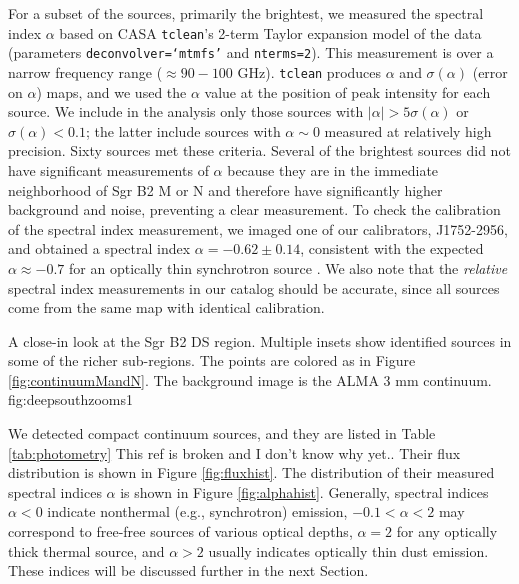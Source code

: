 \documentclass[twocolumn]{aastex61}
\begin{document}
For a subset of the sources, primarily the brightest, we measured the spectral
index $\alpha$ based on CASA \texttt{tclean}'s  2-term Taylor expansion model
of the data (parameters \texttt{deconvolver=`mtmfs'} and \texttt{nterms=2}).
This measurement is over a narrow frequency range ($\approx90-100$ GHz).
\texttt{tclean} produces $\alpha$ and $\sigma(\alpha)$ (error on $\alpha$)
maps, and we used the $\alpha$ value at the position of peak intensity for each
source.  We include in the analysis only those sources with $|\alpha| > 5
\sigma(\alpha)$ or $\sigma(\alpha) < 0.1$; the latter include sources with
$\alpha\sim0$ measured at relatively high precision.  Sixty sources met these
criteria. Several of the brightest sources did not have significant
measurements of $\alpha$ because they are in the immediate neighborhood of Sgr
B2 M or N and therefore have significantly higher background and noise,
preventing a clear measurement.  To check the calibration of the spectral index
measurement, we imaged one of our calibrators, J1752-2956, and obtained a
spectral index $\alpha=-0.62\pm0.14$, consistent with the expected
$\alpha\approx-0.7$ for an optically thin synchrotron source
\citep[e.g.][]{Condon2007a}.  We also note that the \emph{relative} spectral
index measurements in our catalog should be accurate, since all sources come
from the same map with identical calibration.

{A close-in look at the Sgr B2 DS region.  Multiple insets show identified sources
in some of the richer sub-regions.  The points are colored as in Figure
\ref{fig:continuumMandN}.  The background image is the ALMA 3 mm continuum.}
{fig:deepsouthzooms}{1}{\textwidth}

We detected \ncores compact continuum sources, and they are listed
in Table \ref{tab:photometry} {\color{red} This ref is broken and I don't know
why yet.}.  Their flux distribution is
shown in Figure \ref{fig:fluxhist}.  The distribution of their measured
spectral indices $\alpha$ is shown in Figure \ref{fig:alphahist}.
Generally, spectral indices $\alpha<0$ indicate nonthermal (e.g., synchrotron)
emission, $-0.1<\alpha<2$ may correspond to free-free sources of various
optical depths, $\alpha=2$ for any optically thick thermal source,
and $\alpha>2$ usually indicates optically thin dust emission.  These indices
will be discussed further in the next Section.
\end{document}
